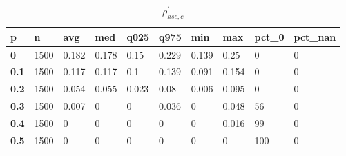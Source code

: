 \begin{table}[h]
 \centering 
\footnotesize
\caption{$\rho_{hsc,c}^\prime $}
\label{tab:alphahscc}
\begin{tabular}[h]{|l|l|l|l|l|l|l|l|l|l|
    } \hline
\textbf{ p} & \textbf{ n} & \textbf{ avg} & \textbf{ med} & \textbf{ q025} & \textbf{ q975} & \textbf{ min} & \textbf{ max} & \textbf{ pct\_0} & \textbf{ pct\_nan}
    \\ \hline
  \textbf{  0} & 1500 & 0.182 & 0.178 &  0.15 & 0.229 & 0.139 &  0.25 &   0 & 0
    \\ \hline
  \textbf{0.1} & 1500 & 0.117 & 0.117 &   0.1 & 0.139 & 0.091 & 0.154 &   0 & 0
    \\ \hline
  \textbf{0.2} & 1500 & 0.054 & 0.055 & 0.023 &  0.08 & 0.006 & 0.095 &   0 & 0
    \\ \hline
  \textbf{0.3} & 1500 & 0.007 &     0 &     0 & 0.036 &     0 & 0.048 &  56 & 0
    \\ \hline
  \textbf{0.4} & 1500 &     0 &     0 &     0 &     0 &     0 & 0.016 &  99 & 0
    \\ \hline
  \textbf{0.5} & 1500 &     0 &     0 &     0 &     0 &     0 &     0 & 100 & 0
    \\ \hline
 \end{tabular}
 \end{table}
